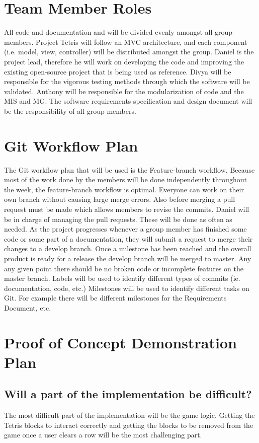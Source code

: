 \documentclass{article}
\begin{document}
\section{Team Member Roles}
All code and documentation and will be divided evenly amongst all group members. Project Tetris will follow an MVC architecture, and each component (i.e. model, view, controller) will be distributed amongst the group. Daniel is the project lead, therefore he will work on developing the code and improving the existing open-source project that is being used as reference. Divya will be responsible for the vigorous testing methods through which the software will be validated. Anthony will be responsible for the modularization of code and the MIS and MG. The software requirements specification and design document will be the responsibility of all group members.

\section{Git Workflow Plan}
The Git workflow plan that will be used is the Feature-branch workflow. Because most of the work done by the members will be done independently throughout the week, the feature-branch workflow is optimal. Everyone can work on their own branch without causing large merge errors. Also before merging a pull request must be made which allows members to revise the commits. Daniel will be in charge of managing the pull requests. These will be done as often as needed. As the project progresses whenever a group member has finished some code or some part of a documentation, they will submit a request to merge their changes to a develop branch. Once a milestone has been reached and the overall product is ready for a release the develop branch will be merged to master. Any any given point there should be no broken code or incomplete features on the master branch. Labels will be used to identify different types of commits (ie. documentation, code, etc.) Milestones will be used to identify different tasks on Git. For example there will be different milestones for the Requirements Document, etc.

\section{Proof of Concept Demonstration Plan}

\subsection{Will a part of the implementation be difficult?}
The most difficult part of the implementation will be the game logic. Getting the Tetris blocks to interact correctly and getting the blocks to be removed from the game once a user clears a row will be the most challenging part.
\end{document}
